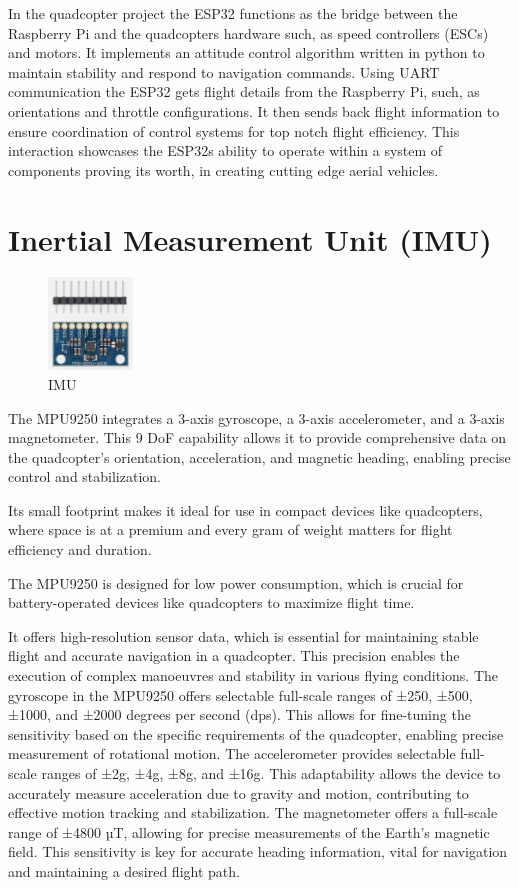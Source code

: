 \documentclass{report}
\begin{document}
In the quadcopter project the ESP32 functions as the bridge between the
Raspberry Pi and the quadcopters hardware such, as speed controllers (ESCs) and
motors. It implements an attitude control algorithm written in python to
maintain stability and respond to navigation commands. Using UART communication
the ESP32 gets flight details from the Raspberry Pi, such, as orientations and
throttle configurations. It then sends back flight information to ensure
coordination of control systems for top notch flight efficiency. This
interaction showcases the ESP32s ability to operate within a system of
components proving its worth, in creating cutting edge aerial vehicles.

\section{Inertial Measurement Unit (IMU)}\label{IMU}
\begin{figure}[H]
  \centering
  \includegraphics[width=0.2\textwidth]{Pictures/IMU.png}
  \caption{IMU}
  \label{fig:IMU}
\end{figure}
The MPU9250 integrates a 3-axis gyroscope, a 3-axis accelerometer, and a 3-axis
magnetometer. This 9 DoF capability allows it to provide comprehensive data on
the quadcopter's orientation, acceleration, and magnetic heading, enabling
precise control and stabilization.

Its small footprint makes it ideal for use in compact devices like quadcopters,
where space is at a premium and every gram of weight matters for flight
efficiency and duration.

The MPU9250 is designed for low power consumption, which is crucial for
battery-operated devices like quadcopters to maximize flight time.

It offers high-resolution sensor data, which is essential for maintaining stable
flight and accurate navigation in a quadcopter. This precision enables the
execution of complex manoeuvres and stability in various flying conditions. The
gyroscope in the MPU9250 offers selectable full-scale ranges of ±250, ±500,
±1000, and ±2000 degrees per second (dps). This allows for fine-tuning the
sensitivity based on the specific requirements of the quadcopter, enabling
precise measurement of rotational motion. The accelerometer provides selectable
full-scale ranges of ±2g, ±4g, ±8g, and ±16g. This adaptability allows the
device to accurately measure acceleration due to gravity and motion,
contributing to effective motion tracking and stabilization. The magnetometer
offers a full-scale range of ±4800 µT, allowing for precise measurements of the
Earth's magnetic field. This sensitivity is key for accurate heading
information, vital for navigation and maintaining a desired flight path.
\end{document}
